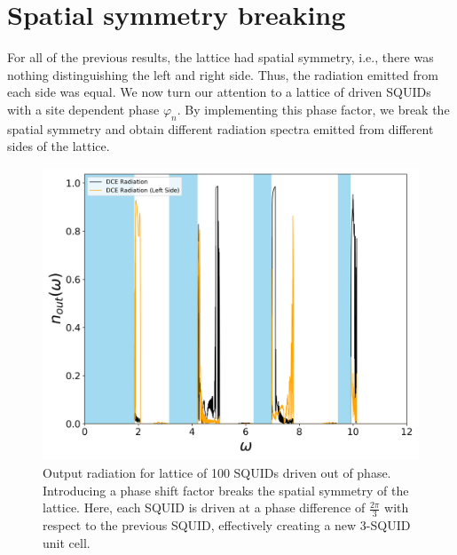\section{Spatial symmetry breaking}\label{sec:results_symmetry_breaking}

For all of the previous results, the lattice had spatial symmetry, i.e., there was nothing distinguishing the left and right side. Thus, the radiation emitted from each side was equal. We now turn our attention to a lattice of driven SQUIDs with a site dependent phase $\varphi_n$. By implementing this phase factor, we break the spatial symmetry and obtain different radiation spectra emitted from different sides of the lattice.
%
\begin{figure}[h]
    \centering
    \includegraphics[width=\textwidth, keepaspectratio]{figures/results/phase_shift_2pi_3_both.png}
    \caption{Output radiation for lattice of 100 SQUIDs driven out of phase. Introducing a phase shift factor breaks the spatial symmetry of the lattice. Here, each SQUID is driven at a phase difference of $\frac{2\pi}{3}$ with respect to the previous SQUID, effectively creating a new 3-SQUID unit cell.}
    \label{fig:phase_2pi_3_both}
\end{figure}
\clearpage
%
%
